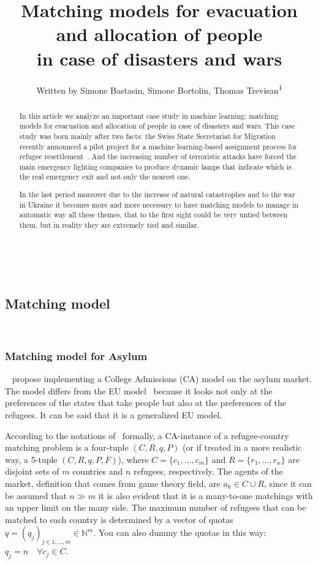 \documentclass[letterpaper]{article} %
\title{Matching models for evacuation and allocation of people\\in case of disasters and wars}
\author{
    Written by Simone Bastasin, Simone Bortolin, Thomas Trevisan\textsuperscript{\rm 1}
    \\
}
\begin{document}
    \maketitle

    \begin{abstract}
        In this article we analyze an important case study in machine learning: matching models for evacuation and allocation of people
        in case of disasters and wars. This case study was born mainly after two facts:
        the Swiss State Secretariat for Migration recently announced a pilot project for a machine
        learning-based assignment process for refugee resettlement~\citet{olbergml}.
        And the increasing number of terroristic attacks have forced the main emergency lighting companies to produce dynamic lamps
        that indicate which is the real emergency exit and not only the nearest one.

        In the last period moreover due to the increase of natural catastrophes and to the war in Ukraine it becomes more and more
        necessary to have matching models to manage in automatic way all these themes, that to the first sight could be very untied
        between them, but in reality they are extremely tied and similar.
    \end{abstract}

    \noindent%
    ~\citet{olbergml,basshuysen,delacretaz_2020,andersson}

    \subsection{Matching model}\label{matching-model}%
    ~\citet{olbergml,basshuysen,delacretaz_2020}

    \subsubsection{Matching model for Asylum}\label{matching-model-for-asylum}%
    ~\citet{olbergml,basshuysen,delacretaz_2020,fernandez} propose implementing a College Admissions (CA)
    model on the asylum market.
    The model differs from the EU model~\citet{basshuysen} because it looks not only at the preferences of the states that
    take people but also at the preferences of the refugees.
    It can be said that it is a generalized EU model.

    According to the notations of~\citet{salles} formally, a CA-instance of a refugee-country matching problem is a
    four-tuple \((C, R, q, P)\) (or if treated in a more realistic way, a 5-tuple \((C, R, q, P, F)\)), where
    \(C = \{c_1, \dots, c_m\}\) and \(R = \{r_1, \dots,r_n\}\) are disjoint sets of \(m\) countries and \(n\) refugees,
    respectively.
    The agents of the market, definition that comes from game theory field, are \(a_k \in C\cup R\),
    since it can be assumed that \(n \gg m\) it is also evident that it is a many-to-one matchings with an upper limit
    on the many side.
    The maximum number of refugees that can be matched to
    each country is determined by a vector of quotas \(q = (q_j)_{j\in {1,...,m}} \in \mathbb{N}^m\).
    You can also dummy the quotas in this way:  \(q_j = n \quad  \forall c_j \in C\).
\end{document}
